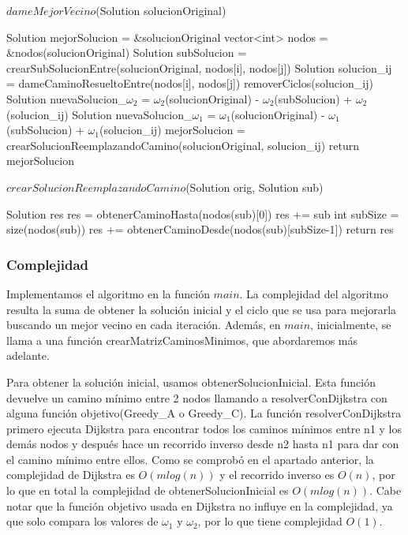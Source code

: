 \begin{algorithm}[H]
\caption{$dameMejorVecino$(Solution solucionOriginal)}
\begin{algorithmic}[1]	
          \State Solution mejorSolucion = \&solucionOriginal
	  \State vector<int> nodos = \&nodos(solucionOriginal)
			\State Solution subSolucion = crearSubSolucionEntre(solucionOriginal, nodos[i], nodos[j])
			\State Solution solucion\_ij = dameCaminoResueltoEntre(nodos[i], nodos[j])
                        \State removerCiclos(solucion\_ij)
			\State Solution nuevaSolucion\_$\omega_2$ = $\omega_2$(solucionOriginal) - $\omega_2$(subSolucion) + $\omega_2$(solucion\_ij)
			\State Solution nuevaSolucion\_$\omega_1$ = $\omega_1$(solucionOriginal) - $\omega_1$(subSolucion) + $\omega_1$(solucion\_ij)			
				\State mejorSolucion = crearSolucionReemplazandoCamino(solucionOriginal, solucion\_ij)
			\EndIf
		\EndFor
	\EndFor
	\State return mejorSolucion
\end{algorithmic}
\end{algorithm}

\begin{algorithm}[H]
\caption{$crearSolucionReemplazandoCamino$(Solution orig, Solution sub)}
\begin{algorithmic}[1]	
	 \State Solution res
	 \State res = obtenerCaminoHasta(nodos(sub)[0])
	 \State res += sub
	 \State int subSize = size(nodos(sub))
	 \State res += obtenerCaminoDesde(nodos(sub)[subSize-1])	  
	\State return res
\end{algorithmic}
\end{algorithm}

\subsubsection{Complejidad}

Implementamos el algoritmo en la función $main$. La complejidad del algoritmo resulta la suma de obtener la solución inicial y el ciclo que se usa para mejorarla buscando un mejor vecino en cada iteración. 
Además, en $main$, inicialmente, se llama a una función crearMatrizCaminosMinimos, que abordaremos más adelante.

Para obtener la solución inicial, usamos obtenerSolucionInicial. Esta función devuelve un camino mínimo entre 2 nodos llamando a resolverConDijkstra con alguna función objetivo(Greedy\_A o Greedy\_C). La función resolverConDijkstra primero ejecuta Dijkstra para encontrar todos los caminos mínimos entre n1 y los demás nodos y después hace un recorrido inverso desde n2 hasta n1 para dar con el camino mínimo entre ellos. Como se comprobó en el apartado anterior, la complejidad de Dijkstra es $O(m log(n))$ y el recorrido inverso es $O(n)$, por lo que en total la complejidad de obtenerSolucionInicial es $O(m log(n))$. Cabe notar que la función objetivo usada en Dijkstra no influye en la complejidad, ya que solo compara los valores de $\omega_1$ y $\omega_2$, por lo que tiene complejidad $O(1)$.

